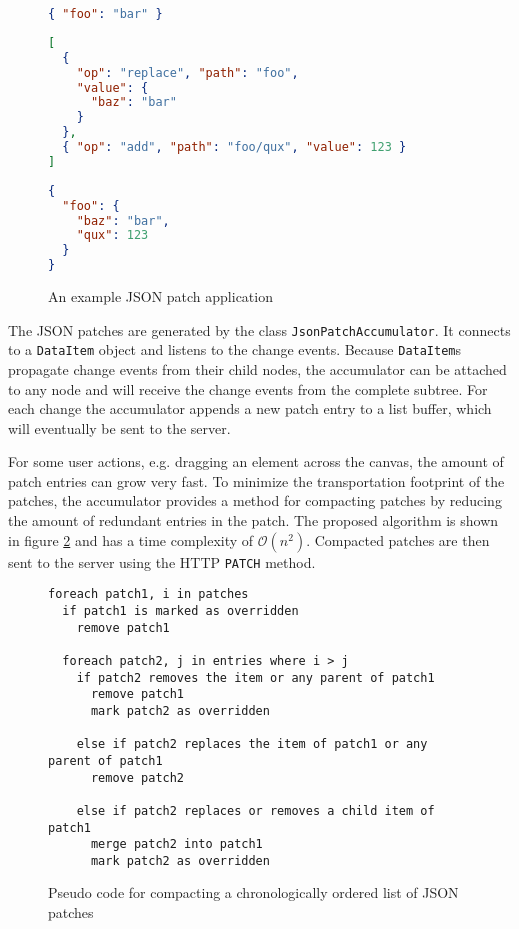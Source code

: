 \begin{figure}
\begin{lstlisting}[language=json,caption=Initial JSON document]
{ "foo": "bar" }
\end{lstlisting}

\begin{lstlisting}[language=json,caption=JSON patch]
[
  { 
    "op": "replace", "path": "foo",
    "value": {
      "baz": "bar"
    }
  },
  { "op": "add", "path": "foo/qux", "value": 123 }
]
\end{lstlisting}

\begin{lstlisting}[language=json,caption=Resulting JSON document]
{
  "foo": {
    "baz": "bar",
    "qux": 123
  }
}
\end{lstlisting}

\caption{An example JSON patch application}
\label{fig:jsonpatch}
\end{figure}


The JSON patches are generated by the class \texttt{JsonPatchAccumulator}. It connects to a \texttt{DataItem} object and listens to the change events. Because \texttt{DataItem}s propagate change events from their child nodes, the accumulator can be attached to any node and will receive the change events from the complete subtree. For each change the accumulator appends a new patch entry to a list buffer, which will eventually be sent to the server.

For some user actions, e.g. dragging an element across the canvas, the amount of patch entries can grow very fast. To minimize the transportation footprint of the patches, the accumulator provides a method for compacting patches by reducing the amount of redundant entries in the patch. The proposed algorithm is shown in figure \ref{fig:patchcompact} and has a time complexity of $\mathcal O(n^2)$. Compacted patches are then sent to the server using the HTTP \texttt{PATCH} method.

\begin{figure}
\begin{lstlisting}[language=pseudo]
foreach patch1, i in patches
  if patch1 is marked as overridden
    remove patch1
  
  foreach patch2, j in entries where i > j
    if patch2 removes the item or any parent of patch1
      remove patch1
      mark patch2 as overridden
      
    else if patch2 replaces the item of patch1 or any parent of patch1
      remove patch2
     
    else if patch2 replaces or removes a child item of patch1
      merge patch2 into patch1
      mark patch2 as overridden    
\end{lstlisting}
\caption{Pseudo code for compacting a chronologically ordered list of JSON patches}
\label{fig:patchcompact}
\end{figure}

